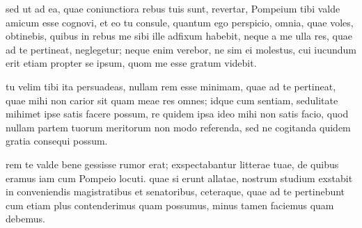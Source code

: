  sed ut ad ea, quae coniunctiora rebus tuis sunt, revertar, Pompeium tibi valde amicum esse cognovi, et eo tu consule, quantum ego perspicio, omnia, quae voles, obtinebis, quibus in rebus me sibi ille adfixum habebit, neque a me ulla res, quae ad te pertineat, neglegetur; neque enim verebor, ne sim ei molestus, cui iucundum erit etiam propter se ipsum, quom me esse gratum videbit.

 tu velim tibi ita persuadeas, nullam rem esse minimam, quae ad te pertineat, quae mihi non carior sit quam meae res omnes; idque cum sentiam, sedulitate mihimet ipse satis facere possum, re quidem ipsa ideo mihi non satis facio, quod nullam partem tuorum meritorum non modo referenda, sed ne cogitanda quidem gratia consequi possum.

 rem te valde bene gessisse rumor erat; exspectabantur litterae tuae, de quibus eramus iam cum Pompeio locuti. quae si erunt allatae, nostrum studium exstabit in conveniendis magistratibus et senatoribus, ceteraque, quae ad te pertinebunt cum etiam plus contenderimus quam possumus, minus tamen faciemus quam debemus.
